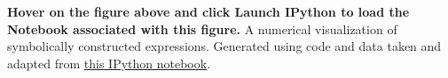 \textbf{\label{fig:2}} \textbf{Hover on the figure above and click Launch IPython to load the Notebook associated with this figure.} A numerical visualization of symbolically constructed expressions. Generated using code and data taken and adapted from \href{http://nbviewer.ipython.org/static/img/example-nb/sympy.png}{this IPython notebook}.